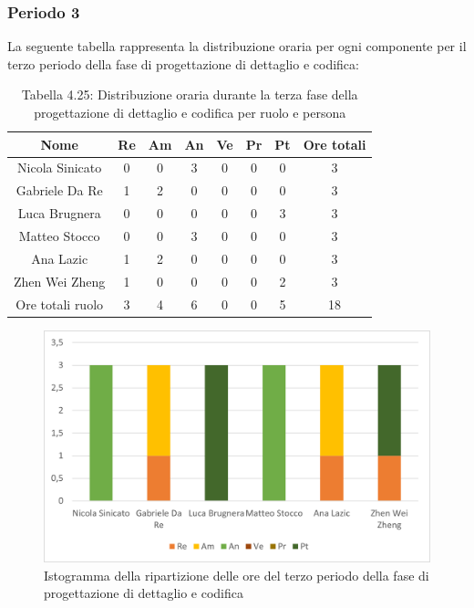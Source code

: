 \subsubsection{Periodo 3}
%
La seguente tabella rappresenta la distribuzione oraria per ogni componente per il terzo periodo della fase di progettazione di dettaglio e codifica:
\begin{table}[h]
	\setlength\extrarowheight{5pt}
	\centering
	\begin{tabularx}{\textwidth}{|ccccccc|c|}
		\hline
		\rowcolor{white}
		\textbf{Nome} & \textbf{Re} & \textbf{Am} & \textbf{An} & \textbf{Ve} & \textbf{Pr}& \textbf{Pt} & \textbf{Ore totali} \\
		\hline
		Nicola Sinicato &0&0&3&0&0&0&3 \\
		Gabriele Da Re &1&2&0&0&0&0&3 \\
		Luca Brugnera &0&0&0&0&0&3&3 \\
		Matteo Stocco &0&0&3&0&0&0&3 \\
		Ana Lazic &1&2&0&0&0&0&3 \\
		Zhen Wei Zheng &1&0&0&0&0&2&3 \\
		\hline
		Ore totali ruolo &3&4&6&0&0&5&18 \\
		\hline
	\end{tabularx}
	\vspace{10pt}
	\caption{Tabella 4.25: Distribuzione oraria durante la terza fase della progettazione di dettaglio e codifica per ruolo e persona}
\end{table}
\begin{figure}[H]
    \centering
    \includegraphics[scale=0.6]{img/grafi preventivo/istogrammi/codifica/periodo3.png}
    \caption{Istogramma della ripartizione delle ore del terzo periodo della fase di progettazione di dettaglio e codifica}
\end{figure}

